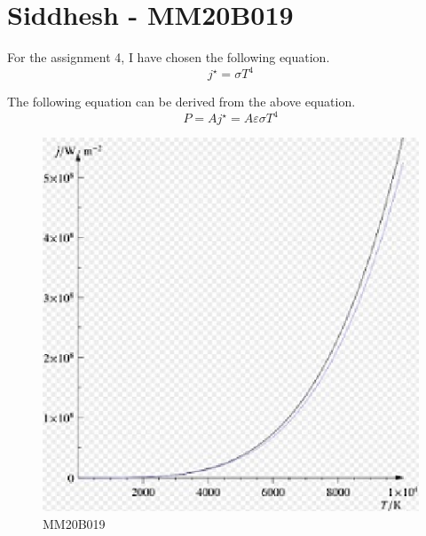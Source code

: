 %




\section{Siddhesh - MM20B019}
For the assignment 4, I have chosen the following equation.
\begin{equation}
         j^{\star} = \sigma T^{4}
        \label{eqn:stefboltz}
\end{equation}

The following equation can be derived from the above equation.
\begin{equation}
     P= A j^{\star} = A \varepsilon\sigma T^{4}
        \label{eqn2:stefboltz}
\end{equation}

\begin{figure}[h]
        \begin{center}
                \includegraphics[scale=0.80]{mm20b019/mm20b019.eps}
        \end{center}
        \caption{MM20B019}
        \label{graph}
\end{figure}


